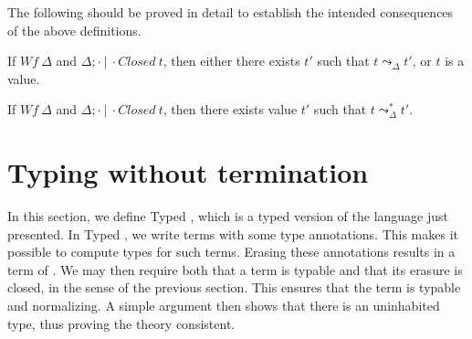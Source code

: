 \documentclass{article}
\begin{document}
The following should be proved in detail to establish the intended consequences of the above definitions.

\begin{proposition}[Safety]
  If $\textit{Wf}\ \Delta$ and $\Delta;\cdot\ |\ \cdot \textit{Closed}\ t$,
  then either there exists $t'$ such that $t \leadsto_\Delta t'$, or
  $t$ is a value.
\end{proposition}

\begin{proposition}[Normalization]
  If $\textit{Wf}\ \Delta$ and $\Delta;\cdot\ |\ \cdot \textit{Closed}\ t$,
  then there exists value $t'$ such that $t \leadsto_\Delta^* t'$.
\end{proposition}

\section{Typing without termination}

In this section, we define Typed \sar, which is a typed version of the
\sar language just presented.  In Typed \sar, we write terms with some
type annotations.  This makes it possible to compute types for such terms.
Erasing these annotations results in a term of \sar.  We may then require
both that a term is typable and that its erasure is closed, in the sense
of the previous section.  This ensures that the term is typable and
normalizing.  A simple argument then shows that there is an uninhabited
type, thus proving the theory consistent.


 
\end{document}
